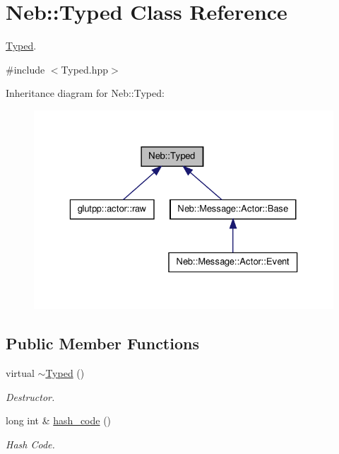 \hypertarget{classNeb_1_1Typed}{\section{\-Neb\-:\-:\-Typed \-Class \-Reference}
\label{classNeb_1_1Typed}
}


\hyperlink{classNeb_1_1Typed}{\-Typed}.  




{\ttfamily \#include $<$\-Typed.\-hpp$>$}



\-Inheritance diagram for \-Neb\-:\-:\-Typed\-:\nopagebreak
\begin{figure}[H]
\begin{center}
\leavevmode
\includegraphics[width=329pt]{classNeb_1_1Typed__inherit__graph}
\end{center}
\end{figure}
\subsection*{\-Public \-Member \-Functions}
\begin{DoxyCompactItemize}
\item 
\hypertarget{classNeb_1_1Typed_ac7a0fd653ad4c09abc20fc9f24942042}{virtual \hyperlink{classNeb_1_1Typed_ac7a0fd653ad4c09abc20fc9f24942042}{$\sim$\-Typed} ()}\label{classNeb_1_1Typed_ac7a0fd653ad4c09abc20fc9f24942042}

\begin{DoxyCompactList}\small\item\em \-Destructor. \end{DoxyCompactList}\item 
\hypertarget{classNeb_1_1Typed_a75878612e933c37ce060bb0d63889051}{long int \& \hyperlink{classNeb_1_1Typed_a75878612e933c37ce060bb0d63889051}{hash\-\_\-code} ()}\label{classNeb_1_1Typed_a75878612e933c37ce060bb0d63889051}

\begin{DoxyCompactList}\small\item\em \-Hash \-Code. \end{DoxyCompactList}\end{DoxyCompactItemize}

